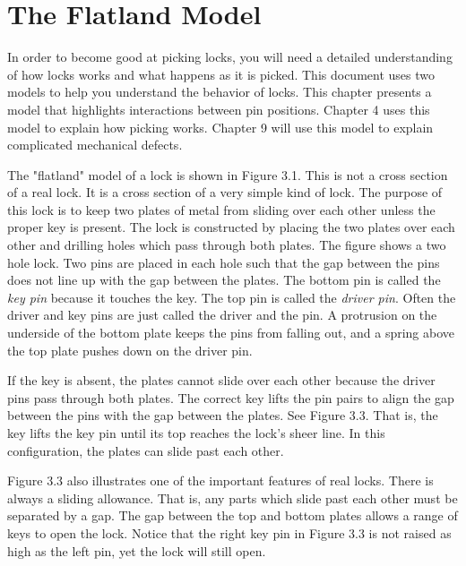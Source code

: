 \chapter{The Flatland Model}
In order to become good at picking locks, you will need a detailed understanding of how
locks works and what happens as it is picked. This document uses two models to help you
understand the behavior of locks. This chapter presents a model that highlights interactions
between pin positions. Chapter 4 uses this model to explain how picking works. Chapter 9
will use this model to explain complicated mechanical defects.

The "flatland" model of a lock is shown in Figure 3.1. This is not a cross section of a
real lock. It is a cross section of a very simple kind of lock. The purpose of this lock is to
keep two plates of metal from sliding over each other unless the proper key is present. The
lock is constructed by placing the two plates over each other and drilling holes which pass
through both plates. The figure shows a two hole lock. Two pins are placed in each hole
such that the gap between the pins does not line up with the gap between the plates.
The bottom pin is called the \textit{key pin} because it touches the key.
The top pin is called the \textit{driver pin}. Often the driver and key pins are just called the driver and the pin. A protrusion on the underside of the bottom plate keeps the pins from falling out, and a spring above the top plate pushes down on the driver pin.

If the key is absent, the plates cannot slide over each other because the driver pins pass
through both plates. The correct key lifts the pin pairs to align the gap between the pins
with the gap between the plates. See Figure 3.3. That is, the key lifts the key pin until its
top reaches the lock's sheer line. In this configuration, the plates can slide past each other.

Figure 3.3 also illustrates one of the important features of real locks. There is always a
sliding allowance. That is, any parts which slide past each other must be separated by a
gap. The gap between the top and bottom plates allows a range of keys to open the lock.
Notice that the right key pin in Figure 3.3 is not raised as high as the left pin, yet the lock
will still open.
